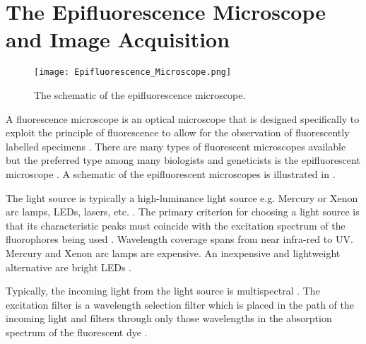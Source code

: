
\section{The Epifluorescence Microscope and Image Acquisition}
\label{sec:TheEpifluorescenceMicroscope}

\begin{figure}[!t]
	\centering
	\texttt{[image: Epifluorescence\_Microscope.png]}
	\caption{The schematic of the epifluorescence microscope.}
	\label{fig:epifluorescencemicroscope}
\end{figure}

A fluorescence microscope is an optical microscope that is designed specifically to exploit the principle of fluorescence to allow for the observation of fluorescently labelled specimens \citep{Andrews2002,Fatima2008}.
There are many types of fluorescent microscopes available but the preferred type among many biologists and geneticists is the epifluorescent microscope \citep{Rice2016,AbramowitzDavidson2016}.
A schematic of the epifluorescent microscopes is illustrated in .

\begin{definition}
	The light source is typically a high-luminance light source e.g. Mercury or Xenon arc lamps, LEDs, lasers, etc. \citep{Rice2016,ThermoFisher2016}.
	The primary criterion for choosing a light source is that its characteristic peaks must coincide with the excitation spectrum of the fluorophores being used \citep{LichtmanConchello2005,Spring2003,Fatima2008}.
	Wavelength coverage spans from near infra-red to UV.
	Mercury and Xenon arc lamps are expensive. An inexpensive and lightweight alternative are bright LEDs \citep{Aswani2012,Koch1972}.
\end{definition}

\begin{definition}
	Typically, the incoming light from the light source is multispectral \citep{SpringDavisdson2016}. 
	The excitation filter is a wavelength selection filter which is placed in the path of the incoming light and filters through only those wavelengths in the absorption spectrum of the fluorescent dye \citep{Danek2012,Dobrucki2013}.
\end{definition}

